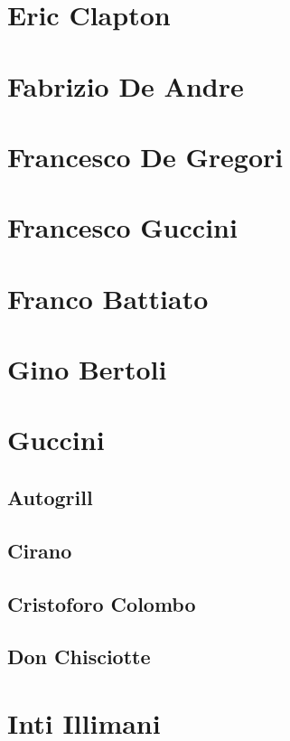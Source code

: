 \chapter{Eric Clapton}

\chapter{Fabrizio De Andre}

\chapter{Francesco De Gregori}

\chapter{Francesco Guccini}

\chapter{Franco Battiato}

\chapter{Gino Bertoli}

\chapter{Guccini}
\section{Autogrill}
\section{Cirano}
\section{Cristoforo Colombo}
\section{Don Chisciotte}

\chapter{Inti Illimani}

